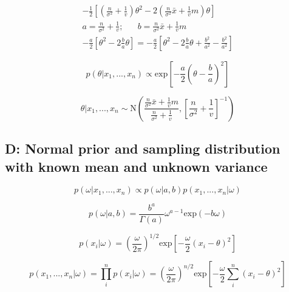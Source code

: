 \documentclass[12pt]{article}
\begin{document}
            \begin{align}
                  -\frac{1}{2} \left[ \left( \frac{n}{\sigma^2} + \frac{1}{v}\right) \theta^2 - 2 \left( \frac{n}{\sigma^2} \bar{x} + \frac{1}{v} m \right) \theta  \right] \\
                  a=\frac{n}{\sigma^2} + \frac{1}{v}; \hspace{20pt} b = \frac{n}{\sigma^2} \bar{x} + \frac{1}{v}m \\
                  -\frac{a}{2} \left [ \theta^2 - 2 \frac{b}{a} \theta \right] = -\frac{a}{2} \left[ \theta^2 - 2 \frac{b}{a} \theta + \frac{b^2}{a^2} - \frac{b^2}{a^2} \right ]
            \end{align}

            \begin{equation}
                  p(\theta|x_1,...,x_n) \propto \text{exp} \left[ - \frac{a}{2} \left ( \theta - \frac{b}{a}\right ) ^2 \right]
            \end{equation}

            \begin{equation}
                  \theta | x_1,...,x_n \sim \text{N} \left( \frac{\frac{n}{\sigma^2} \bar{x} + \frac{1}{v}m}{\frac{n}{\sigma^2} + \frac{1}{v}}, \left [ \frac{n}{\sigma^2} + \frac{1}{v}\right]^{-1} \right)
            \end{equation}

      \subsection*{D: Normal prior and sampling distribution with known mean and unknown variance}

            \begin{equation}
                  p(\omega|x_1,..., x_n) \propto p(\omega|a,b)p(x_1,...,x_n|\omega)
            \end{equation}

            \begin{equation}
                  p(\omega|a,b) = \frac{b^a}{\Gamma(a)} \omega^{a-1} \text{exp}(-b \omega)
            \end{equation}

            \begin{equation}
                  p(x_i|\omega) = \left( \frac{\omega}{2 \pi}\right)^{1/2} \text{exp} \left [ -\frac{\omega}{2}(x_i - \theta)^2\right]
            \end{equation}

            \begin{equation}
                  p(x_1,...,x_n|\omega) = \prod_i^n p(x_i|\omega) = \left( \frac{\omega}{2 \pi}\right)^{n/2} \text{exp} \left [ -\frac{\omega}{2}\sum_i^n(x_i - \theta)^2\right]
            \end{equation}
\end{document}
